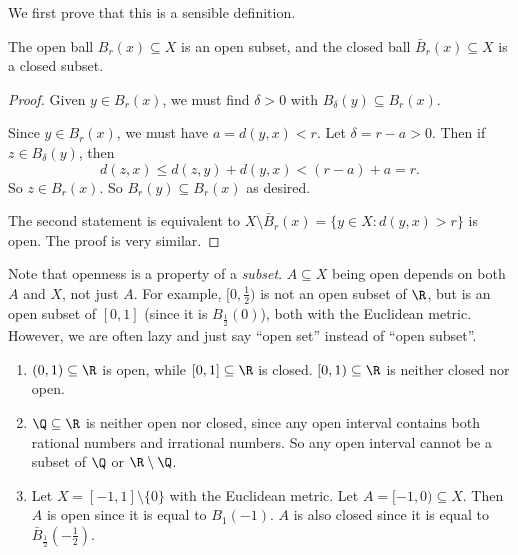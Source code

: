 \documentclass[a4paper]{article}
\begin{document}
We first prove that this is a sensible definition.
\begin{lemma}
  The open ball $B_r(x) \subseteq X$ is an open subset, and the closed ball $\bar{B}_r(x) \subseteq X$ is a closed subset.
\end{lemma}

\begin{proof}
  Given $y\in B_r(x)$, we must find $\delta > 0$ with $B_\delta(y) \subseteq B_r(x)$.
  \begin{center}
  \end{center}
  Since $y\in B_r(x)$, we must have $a = d(y, x) < r$. Let $\delta = r - a > 0$. Then if $z \in B_\delta (y)$, then
  \[
    d(z, x)\leq d(z, y) + d(y, x) < (r - a) + a = r.
  \]
  So $z \in B_r(x)$. So $B_r(y) \subseteq B_r(x)$ as desired.

  The second statement is equivalent to $X\setminus \bar{B}_r(x) = \{y\in X: d(y, x) > r\}$ is open. The proof is very similar.
\end{proof}
Note that openness is a property of a \emph{subset}. $A\subseteq X$ being open depends on both $A$ and $X$, not just $A$. For example, $[0, \frac{1}{2})$ is not an open subset of $\R$, but is an open subset of $[0, 1]$ (since it is $B_{\frac{1}{2}}(0)$), both with the Euclidean metric. However, we are often lazy and just say ``open set'' instead of ``open subset''.

\begin{eg}\leavevmode
  \begin{enumerate}
    \item $(0, 1)\subseteq \R$ is open, while $[0, 1]\subseteq \R$ is closed. $[0, 1)\subseteq \R$ is neither closed nor open.
    \item $\Q\subseteq \R$ is neither open nor closed, since any open interval contains both rational numbers and irrational numbers. So any open interval cannot be a subset of $\Q$ or $\R\setminus \Q$.
    \item Let $X = [-1, 1] \setminus \{0\}$ with the Euclidean metric. Let $A = [-1, 0)\subseteq X$. Then $A$ is open since it is equal to $B_1(-1)$. $A$ is also closed since it is equal to $\bar B_{\frac{1}{2}}(-\frac{1}{2})$.
  \end{enumerate}
\end{eg}
\end{document}
